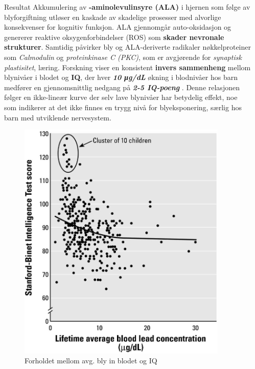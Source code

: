 \documentclass[final]{beamer}
\title{\vphantom{Hvordan fører \text{\textit{Tetraetylbly (\ce{Pb(C_2H_5)_4})}} til kognitiv svekkelse?}}
\author{\vphantom{Temor Yari}}
\institute[Bjerke Videregående Skole]{\vphantom{Bjerke Videregående Skole}}
\newlength{\sepwidth}
\newlength{\colwidth}
\newcommand{\separatorcolumn}{\begin{column}{\sepwidth}\end{column}}
\begin{document}
\begin{frame}[t] %
	\begin{columns}[t]
		\separatorcolumn

		\begin{column}{\colwidth}

			\begin{alertblock}{Resultat}
				Akkumulering av \textbf{\delta-aminolevulinsyre (ALA)} i hjernen som følge av blyforgiftning
				utløser en kaskade av skadelige prosesser med alvorlige konsekvenser for kognitiv funksjon.
				ALA gjennomgår auto-oksidasjon og genererer reaktive oksygenforbindelser (ROS) som
				\textbf{skader nevronale strukturer}. Samtidig påvirker bly og ALA-deriverte radikaler
				nøkkelproteiner som \textit{Calmodulin} og \textit{proteinkinase C (PKC)}, som er avgjørende
				for \textit{synaptisk plastisitet}, læring. Forskning viser en konsistent \textbf{invers
					sammenheng} mellom blynivåer i blodet og \textbf{IQ}, der hver \textbf{\textit{10 μg/dL}}
				økning i blodnivåer hos barn medfører en gjennomsnittlig nedgang på \textbf{\textit{2-5
						IQ-poeng}} . Denne relasjonen følger en ikke-lineær kurve der selv lave blynivåer har
				betydelig effekt, noe som indikerer at det ikke finnes en trygg nivå for blyeksponering,
				særlig hos barn med utviklende nervesystem.

				\begin{figure}[h!]
					\centering
					\vspace{0.5cm}
					\includegraphics[width=10cm]{./assets/IQ_lead_relation.jpg}
					\caption{Forholdet mellom avg. bly in blodet og IQ}
				\end{figure}
			\end{alertblock}




\end{column}
\end{columns}
\end{frame}
\end{document}

